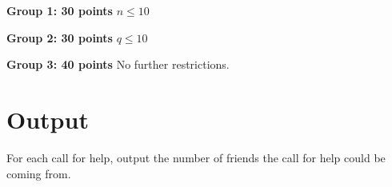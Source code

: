 \begin{description}
    \item{\textbf{Group 1: 30 points}} $n \leq 10$
    \item{\textbf{Group 2: 30 points}} $q \leq 10$
    \item{\textbf{Group 3: 40 points}} No further restrictions.
\end{description}


\section*{Output}
For each call for help, output the number of friends the call for help could be coming from.
